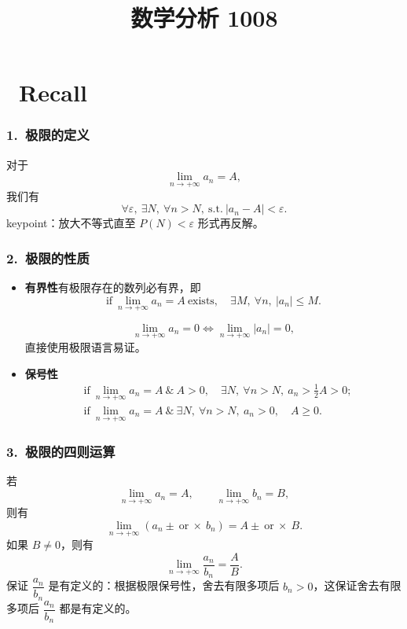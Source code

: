 \documentclass[UTF8,11pt]{ctexart}
\title{数学分析 1008}
\date{}
\theoremstyle{cnthm}
\begin{document}
\maketitle

\section{\ Recall}

\subsubsection*{1.\ 极限的定义}

对于
\[
\lim_{n\to+\infty}a_n=A,
\]
我们有
\[
\forall\varepsilon,\ \exists N,\ \forall n>N,\ \text{s.t.}\
|a_n-A|<\varepsilon .
\]
keypoint：放大不等式直至 $P(N)<\varepsilon$ 形式再反解。

\subsubsection*{2.\ 极限的性质}

\begin{itemize}
\item \textbf{有界性}\quad 有极限存在的数列必有界，即
\[
\text{if}\ \lim_{n\to+\infty}a_n=A\ \text{exists},\quad
\exists M,\ \forall n,\ |a_n|\leq M .
\]

\[
\lim_{n\to+\infty}a_n=0
\iff \lim_{n\to+\infty}|a_n|=0,
\]
直接使用极限语言易证。

\item \textbf{保号性}
\[
\begin{aligned}
&\text{if}\ \lim_{n\to+\infty}a_n=A\ \&\ A>0,
\quad\exists N,\ \forall n>N,\ a_n>\frac12A>0;\\
&\text{if}\ \lim_{n\to+\infty}a_n=A\ \&\ \exists N,\
\forall n>N,\ a_n>0,\quad A\geq0 .
\end{aligned}
\]
\end{itemize}

\subsubsection*{3.\ 极限的四则运算}

若
\[
\lim_{n\to+\infty}a_n=A,\qquad \lim_{n\to+\infty}b_n=B,
\]
则有
\[
\lim_{n\to+\infty}(a_n\pm\ \text{or}\ \times\ b_n)
=A\pm\ \text{or}\ \times\ B .
\]
如果 $B\neq0$，则有
\[
\lim_{n\to+\infty}\frac{a_n}{b_n}=\frac AB .
\]
保证 $\dfrac{a_n}{b_n}$ 是有定义的：根据极限保号性，舍去有限多项后
$b_n>0$，这保证舍去有限多项后 $\dfrac{a_n}{b_n}$ 都是有定义的。
\end{document}
